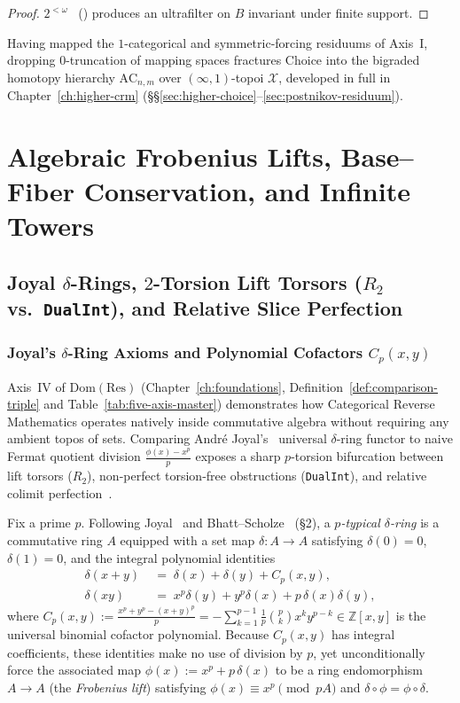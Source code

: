 \begin{proof}
$2^{<\omega}$~\cite{HalpernLevy71} (\cite[Ch.~7, Thm.~7.11]{Jech73}) produces an ultrafilter on $B$ invariant under finite support.
\end{proof}

Having mapped the $1$-categorical and symmetric-forcing residuums of Axis~I, dropping $0$-truncation of mapping spaces fractures Choice into the bigraded homotopy hierarchy $\mathrm{AC}_{n, m}$ over $(\infty, 1)$-topoi $\mathcal{X}$, developed in full in Chapter~\ref{ch:higher-crm} (\S\S\ref{sec:higher-choice}--\ref{sec:postnikov-residuum}).

\part{Algebraic Frobenius Lifts, Base--Fiber Conservation, and Infinite Towers}

\chapter{Joyal $\delta$-Rings, $2$-Torsion Lift Torsors ($R_2$ vs.\ \texttt{DualInt}), and Relative Slice Perfection}

\label{ch:delta-rings}

\section{Joyal's $\delta$-Ring Axioms and Polynomial Cofactors $C_p(x, y)$}\label{sec:delta-rings}

Axis~IV of $\mathrm{Dom}(\mathrm{Res})$ (Chapter~\ref{ch:foundations}, Definition~\ref{def:comparison-triple} and Table~\ref{tab:five-axis-master}) demonstrates how Categorical Reverse Mathematics operates natively inside commutative algebra without requiring any ambient topos of sets. Comparing Andr\'e Joyal's~\cite{Joyal85} universal $\delta$-ring functor to naive Fermat quotient division $\frac{\phi(x) - x^p}{p}$ exposes a sharp $p$-torsion bifurcation between lift torsors ($R_2$), non-perfect torsion-free obstructions (\texttt{DualInt}), and relative colimit perfection~\cite{BhattScholze22,Goldthorpe23}.

Fix a prime $p$. Following Joyal~\cite{Joyal85} and Bhatt--Scholze~\cite{BhattScholze22} (\S2), a \emph{$p$-typical $\delta$-ring} is a commutative ring $A$ equipped with a set map $\delta : A \to A$ satisfying $\delta(0) = 0$, $\delta(1) = 0$, and the integral polynomial identities
\[
  \begin{aligned}
    \delta(x + y) &\;=\; \delta(x) + \delta(y) + C_p(x, y), \\
    \delta(xy) &\;=\; x^p\delta(y) + y^p\delta(x) + p\,\delta(x)\delta(y),
  \end{aligned}
\]
where $C_p(x, y) := \frac{x^p + y^p - (x+y)^p}{p} = -\sum_{k=1}^{p-1} \frac{1}{p}\binom{p}{k} x^k y^{p-k} \in \mathbb{Z}[x, y]$ is the universal binomial cofactor polynomial. Because $C_p(x, y)$ has integral coefficients, these identities make no use of division by $p$, yet unconditionally force the associated map $\phi(x) := x^p + p\,\delta(x)$ to be a ring endomorphism $A \to A$ (the \emph{Frobenius lift}) satisfying $\phi(x) \equiv x^p \pmod{pA}$ and $\delta \circ \phi = \phi \circ \delta$.


